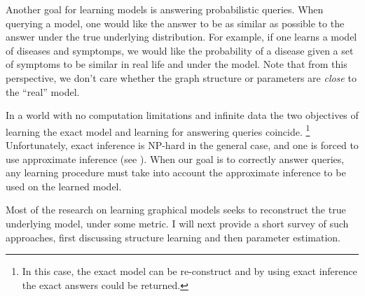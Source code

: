 
Another goal for learning models %
is answering probabilistic queries.
When querying a model, one would like the answer to be as similar as possible to the answer under the true underlying distribution.
For example, if one learns a model of diseases and symptomps, we would like the probability of a disease given a set of symptoms to be similar in real life and under the model.
Note that from this perspective, we don't care whether the graph structure or parameters are {\em close} to the ``real'' model. 


In a world with no computation limitations and infinite data the two objectives of learning the exact model and learning for answering queries coincide.
\footnote{In this case, the exact model can be re-construct and by using exact inference the exact answers could be returned.}
Unfortunately, exact inference is NP-hard in the general case, and one is forced to use approximate inference (see ).
When our goal is to correctly answer queries, any learning procedure must take into account the approximate inference to be used on the learned model.



Most of the research on learning graphical models seeks to reconstruct the true underlying model, under some metric. I will next provide a short survey of such approaches, first discussing structure learning and then parameter estimation.




